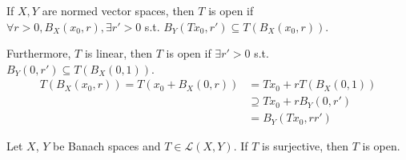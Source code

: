 \begin{rem}
    If $X, Y$ are normed vector spaces, then $T$ is open if \\ $\forall r > 0, B_X(x_0, r), 
    \exists r' > 0$ s.t. $B_Y(Tx_0, r') \subseteq T(B_X(x_0, r))$.
    
    Furthermore, $T $ is linear, then $T$ is open if $\exists r' > 0$ s.t. $B_Y(0, r') 
    \subseteq T(B_X(0, 1))$. 
    \begin{align*}
        T(B_X(x_0, r)) = T(x_0 + B_X(0, r))
        &= Tx_0 + rT(B_X(0, 1)) \\
        &\supseteq Tx_0 + rB_Y(0, r') \\
        &= B_Y(Tx_0, rr')
        \end{align*}
\end{rem}

\begin{thm}
    Let $X$, $Y$ be Banach spaces and $T \in \mathcal{L}(X, Y)$. If $T$ is surjective, 
    then $T$ is open.     
\end{thm}
